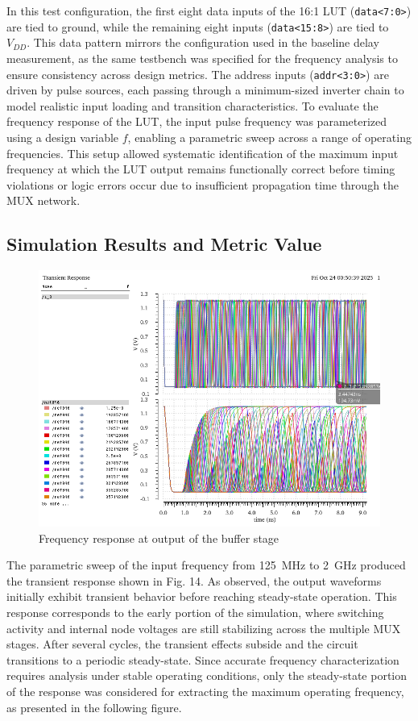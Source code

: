 \documentclass[12pt]{article}
\begin{document}
In this test configuration, the first eight data inputs of the 16:1 LUT (\texttt{data<7:0>}) are tied to ground, while the remaining eight inputs (\texttt{data<15:8>}) are tied to $V_{DD}$. This data pattern mirrors the configuration used in the baseline delay measurement, as the same testbench was specified for the frequency analysis to ensure consistency across design metrics. The address inputs (\texttt{addr<3:0>}) are driven by pulse sources, each passing through a minimum-sized inverter chain to model realistic input loading and transition characteristics. To evaluate the frequency response of the LUT, the input pulse frequency was parameterized using a design variable $f$, enabling a parametric sweep across a range of operating frequencies. This setup allowed systematic identification of the maximum input frequency at which the LUT output remains functionally correct before timing violations or logic errors occur due to insufficient propagation time through the MUX network.


\newpage

\subsection{Simulation Results and Metric Value}

\begin{figure}[H]
    \centering
    \includegraphics[width=\linewidth]{writeup//figures/frequency_response_param.png}
    \caption{Frequency response at output of the buffer stage}
\end{figure}

The parametric sweep of the input frequency from 125~MHz to 2~GHz produced the transient response shown in Fig. 14. As observed, the output waveforms initially exhibit transient behavior before reaching steady-state operation. This response corresponds to the early portion of the simulation, where switching activity and internal node voltages are still stabilizing across the multiple MUX stages. After several cycles, the transient effects subside and the circuit transitions to a periodic steady-state. Since accurate frequency characterization requires analysis under stable operating conditions, only the steady-state portion of the response was considered for extracting the maximum operating frequency, as presented in the following figure.
\end{document}
